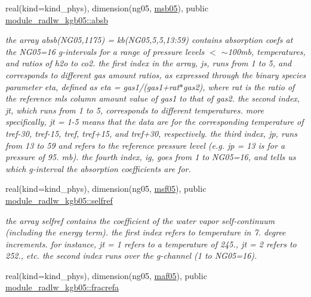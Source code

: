\begin{DoxyCompactItemize}
real(kind=kind\+\_\+phys), dimension(ng05, \hyperlink{group__module__radlw__kgbnn_ga0f3b6573bfe94c5a5968cda2dc8b1adf}{msb05}), public \hyperlink{group__module__radlw__kgbnn_gaebc667b0569824bba455e822eaea6112}{module\+\_\+radlw\+\_\+kgb05\+::absb}
\begin{DoxyCompactList}\small\item\em the array absb(\+N\+G05,1175) = kb(\+N\+G05,5,5,13\+:59) contains absorption coefs at the N\+G05=16 g-\/intervals for a range of pressure levels $<$ $\sim$100mb, temperatures, and ratios of h2o to co2. the first index in the array, js, runs from 1 to 5, and corresponds to different gas amount ratios, as expressed through the binary species parameter eta, defined as eta = gas1/(gas1+rat$\ast$gas2), where rat is the ratio of the reference mls column amount value of gas1 to that of gas2. the second index, jt, which runs from 1 to 5, corresponds to different temperatures. more specifically, jt = 1-\/5 means that the data are for the corresponding temperature of tref-\/30, tref-\/15, tref, tref+15, and tref+30, respectively. the third index, jp, runs from 13 to 59 and refers to the reference pressure level (e.\+g. jp = 13 is for a pressure of 95. mb). the fourth index, ig, goes from 1 to N\+G05=16, and tells us which g-\/interval the absorption coefficients are for. \end{DoxyCompactList}\item 
\mbox{\label{group__module__radlw__kgbnn_ga3c727eabe159c88fca912f33a2b91943}} 
real(kind=kind\+\_\+phys), dimension(ng05, \hyperlink{group__module__radlw__kgbnn_ga1c9a43b7011e7328fa62d3ecd29acc73}{msf05}), public \hyperlink{group__module__radlw__kgbnn_ga3c727eabe159c88fca912f33a2b91943}{module\+\_\+radlw\+\_\+kgb05\+::selfref}
\begin{DoxyCompactList}\small\item\em the array selfref contains the coefficient of the water vapor self-\/continuum (including the energy term). the first index refers to temperature in 7. degree increments. for instance, jt = 1 refers to a temperature of 245., jt = 2 refers to 252., etc. the second index runs over the g-\/channel (1 to N\+G05=16). \end{DoxyCompactList}\item 
\mbox{\label{group__module__radlw__kgbnn_ga335fd60e59154f47724d2e25fdf0a5fb}} 
real(kind=kind\+\_\+phys), dimension(ng05, \hyperlink{group__module__radlw__kgbnn_gaba904215976d7f4316b52c8f0cffe595}{maf05}), public \hyperlink{group__module__radlw__kgbnn_ga335fd60e59154f47724d2e25fdf0a5fb}{module\+\_\+radlw\+\_\+kgb05\+::fracrefa}

\end{DoxyCompactItemize}
